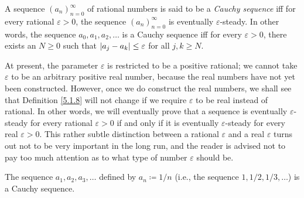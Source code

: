 \setcounter{theorem}{7}
\begin{definition}\label{5.1.8}
    A sequence \((a_n)_{n = 0}^{\infty}\) of rational numbers is said to be a \emph{Cauchy sequence} iff for every rational \(\varepsilon > 0\), the sequence \((a_n)_{n = 0}^{\infty}\) is eventually \(\varepsilon\)-steady.
    In other words, the sequence \(a_0, a_1, a_2, \dots\) is a Cauchy sequence iff for every \(\varepsilon > 0\), there exists an \(N \geq 0\) such that \(\left\lvert a_j - a_k\right\rvert \leq \varepsilon\) for all \(j, k \geq N\).
\end{definition}

\begin{remark}\label{5.1.9}
    At present, the parameter \(\varepsilon\) is restricted to be a positive rational;
    we cannot take \(\varepsilon\) to be an arbitrary positive real number, because the real numbers have not yet been constructed.
    However, once we do construct the real numbers, we shall see that Definition \ref{5.1.8} will not change if we require \(\varepsilon\) to be real instead of rational.
    In other words, we will eventually prove that a sequence is eventually \(\varepsilon\)-steady for every rational \(\varepsilon > 0\) if and only if it is eventually \(\varepsilon\)-steady for every real \(\varepsilon > 0\).
    This rather subtle distinction between a rational \(\varepsilon\) and a real \(\varepsilon\) turns out not to be very important in the long run, and the reader is advised not to pay too much attention as to what type of number \(\varepsilon\) should be.
\end{remark}

\setcounter{theorem}{10}
\begin{proposition}\label{5.1.11}
    The sequence \(a_1, a_2, a_3, \dots\) defined by \(a_n \coloneqq 1 / n\) (i.e., the sequence \(1, 1 / 2, 1 / 3, \dots\)) is a Cauchy sequence.
\end{proposition}

